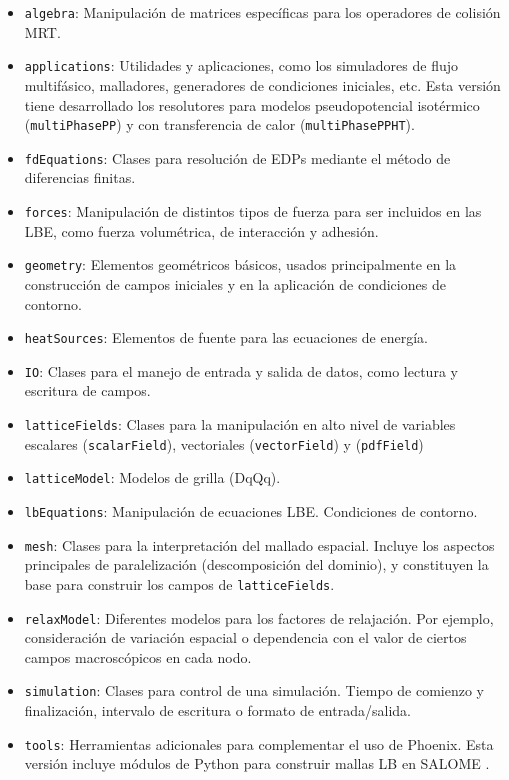 \begin{itemize}
	\item \texttt{algebra}: Manipulaci\'on de matrices espec\'ificas para los operadores de colisi\'on MRT.
	\item \texttt{applications}: Utilidades y aplicaciones, como los simuladores de flujo multif\'asico, malladores, generadores de condiciones iniciales, etc. Esta versi\'on tiene desarrollado los resolutores para modelos pseudopotencial isot\'ermico (\texttt{multiPhasePP}) y con transferencia de calor (\texttt{multiPhasePPHT}).
	\item \texttt{fdEquations}: Clases para resoluci\'on de EDPs mediante el m\'etodo de diferencias finitas.
	\item \texttt{forces}: Manipulaci\'on de distintos tipos de fuerza para ser incluidos en las LBE, como fuerza volum\'etrica, de interacci\'on y adhesi\'on.
	\item \texttt{geometry}: Elementos geom\'etricos b\'asicos, usados principalmente en la construcci\'on de campos iniciales y en la aplicaci\'on de condiciones de contorno.
	\item \texttt{heatSources}: Elementos de fuente para las ecuaciones de energ\'ia.
	\item \texttt{IO}: Clases para el manejo de entrada y salida de datos, como lectura y escritura de campos.
	\item \texttt{latticeFields}: Clases para la manipulaci\'on en alto nivel de variables escalares (\texttt{scalarField}), vectoriales (\texttt{vectorField}) y \fdp{} (\texttt{pdfField})
	\item \texttt{latticeModel}: Modelos de grilla (DqQq).
	\item \texttt{lbEquations}: Manipulaci\'on de ecuaciones LBE. Condiciones de contorno.
	\item \texttt{mesh}: Clases para la interpretaci\'on del mallado espacial. Incluye los aspectos principales de paralelizaci\'on (descomposici\'on del dominio), y constituyen la base para construir los campos de \texttt{latticeFields}.
	\item \texttt{relaxModel}: Diferentes modelos para los factores de relajaci\'on. Por ejemplo, consideraci\'on de variaci\'on espacial o dependencia con el valor de ciertos campos macrosc\'opicos en cada nodo.
	\item \texttt{simulation}: Clases para control de una simulaci\'on. Tiempo de comienzo y finalizaci\'on, intervalo de escritura o formato de entrada/salida.
	\item \texttt{tools}: Herramientas adicionales para complementar el uso de Phoenix. Esta versi\'on incluye m\'odulos de Python para construir mallas LB en SALOME \cite{noauthor_salome_nodate}.
\end{itemize}





